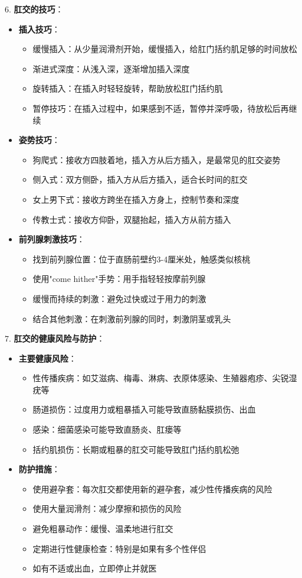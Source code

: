 \documentclass[12pt,UTF8]{ctexbook}
\begin{document}
6. \textbf{肛交的技巧}：
\begin{itemize}
	\item \textbf{插入技巧}：
	\begin{itemize}
		\item 缓慢插入：从少量润滑剂开始，缓慢插入，给肛门括约肌足够的时间放松
		\item 渐进式深度：从浅入深，逐渐增加插入深度
		\item 旋转插入：在插入时轻轻旋转，帮助放松肛门括约肌
		\item 暂停技巧：在插入过程中，如果感到不适，暂停并深呼吸，待放松后再继续
	\end{itemize}
	\item \textbf{姿势技巧}：
	\begin{itemize}
		\item 狗爬式：接收方四肢着地，插入方从后方插入，是最常见的肛交姿势
		\item 侧入式：双方侧卧，插入方从后方插入，适合长时间的肛交
		\item 女上男下式：接收方跨坐在插入方身上，控制节奏和深度
		\item 传教士式：接收方仰卧，双腿抬起，插入方从前方插入
	\end{itemize}
	\item \textbf{前列腺刺激技巧}：
	\begin{itemize}
		\item 找到前列腺位置：位于直肠前壁约3-4厘米处，触感类似核桃
		\item 使用"come hither"手势：用手指轻轻按摩前列腺
		\item 缓慢而持续的刺激：避免过快或过于用力的刺激
		\item 结合其他刺激：在刺激前列腺的同时，刺激阴茎或乳头
	\end{itemize}
\end{itemize}

7. \textbf{肛交的健康风险与防护}：
\begin{itemize}
	\item \textbf{主要健康风险}：
	\begin{itemize}
		\item 性传播疾病：如艾滋病、梅毒、淋病、衣原体感染、生殖器疱疹、尖锐湿疣等
		\item 肠道损伤：过度用力或粗暴插入可能导致直肠黏膜损伤、出血
		\item 感染：细菌感染可能导致直肠炎、肛瘘等
		\item 括约肌损伤：长期或粗暴的肛交可能导致肛门括约肌松弛
	\end{itemize}
	\item \textbf{防护措施}：
	\begin{itemize}
		\item 使用避孕套：每次肛交都使用新的避孕套，减少性传播疾病的风险
		\item 使用大量润滑剂：减少摩擦和损伤的风险
		\item 避免粗暴动作：缓慢、温柔地进行肛交
		\item 定期进行性健康检查：特别是如果有多个性伴侣
		\item 如有不适或出血，立即停止并就医
	\end{itemize}
\end{itemize}
\end{document}
